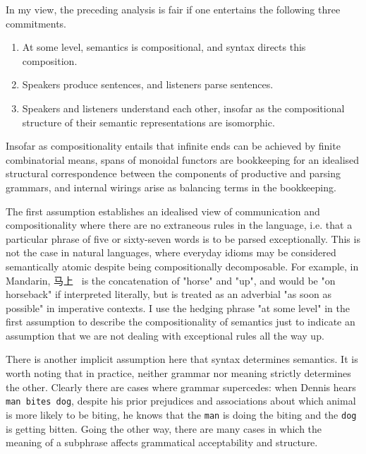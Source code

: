  In my view, the preceding analysis is fair if one entertains the following three commitments.

\begin{enumerate}
\item{At some level, semantics is compositional, and syntax directs this composition.}
\item{Speakers produce sentences, and listeners parse sentences.}
\item{Speakers and listeners understand each other, insofar as the compositional structure of their semantic representations are isomorphic.}
\end{enumerate}

Insofar as compositionality entails that infinite ends can be achieved by finite combinatorial means, spans of monoidal functors are bookkeeping for an idealised structural correspondence between the components of productive and parsing grammars, and internal wirings arise as balancing terms in the bookkeeping.\\


\begin{CJK*}{UTF8}{gbsn}
The first assumption establishes an idealised view of communication and compositionality where there are no extraneous rules in the language, i.e. that a particular phrase of five or sixty-seven words is to be parsed exceptionally. This is not the case in natural languages, where everyday idioms may be considered semantically atomic despite being compositionally decomposable. For example, in Mandarin, 马上 \ is the concatenation of "horse" and "up", and would be "on horseback" if interpreted literally, but is treated as an adverbial "as soon as possible" in imperative contexts. I use the hedging phrase "at some level" in the first assumption to describe the compositionality of semantics just to indicate an assumption that we are not dealing with exceptional rules all the way up.\\
\end{CJK*}

There is another implicit assumption here that syntax determines semantics. It is worth noting that in practice, neither grammar nor meaning strictly determines the other. Clearly there are cases where grammar supercedes: when Dennis hears \texttt{man bites dog}, despite his prior prejudices and associations about which animal is more likely to be biting, he knows that the \texttt{man} is doing the biting and the \texttt{dog} is getting bitten. Going the other way, there are many cases in which the meaning of a subphrase affects grammatical acceptability and structure.

